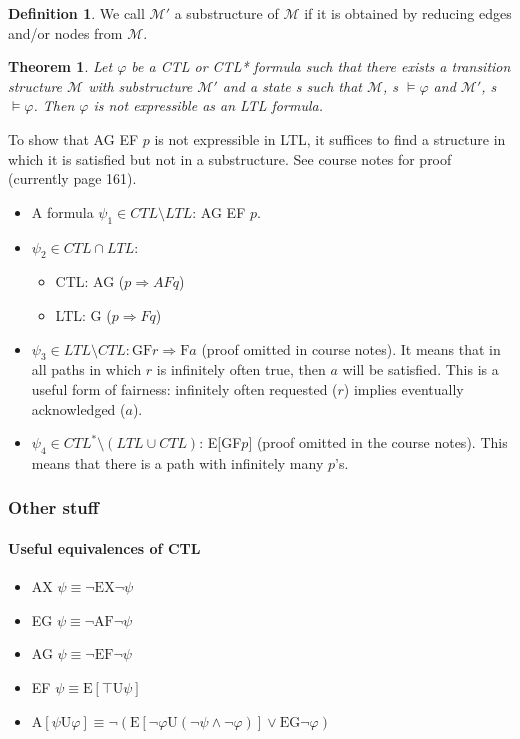 \documentclass[10pt,a4paper]{article}
\theoremstyle{definition}
\newtheorem{definition}{Definition}[section]
\newtheorem{theorem}{Theorem}
\begin{document}
\begin{definition}
We call $\mathcal{M}'$ a substructure of $\mathcal{M}$ if it is obtained by reducing edges and/or nodes from $\mathcal{M}$.
\end{definition}

\begin{theorem}
\textit{Let $\varphi$ be a CTL or CTL* formula such that there exists a transition structure $\mathcal{M}$ with substructure $\mathcal{M}'$ and a state s such that $\mathcal{M}$, s $\models \varphi$ and $\mathcal{M}'$, s $\models \varphi$. Then $\varphi$ is not expressible as an LTL formula.}
\end{theorem}

To show that AG EF $p$ is not expressible in LTL, it suffices to find a structure in which it is satisfied but not in a substructure. See course notes for proof (currently page 161).

\begin{itemize}
	\item A formula $\psi_1 \in CTL \setminus LTL$: AG EF $p$.
	\item $\psi_2 \in CTL \cap LTL:$
	\begin{itemize}
		\item CTL: AG ($p \Rightarrow AF q$)
		\item LTL: G ($p \Rightarrow F q$)
	\end{itemize}
	\item $\psi_3 \in LTL \setminus CTL: \text{GF} r \Rightarrow \text{F} a$ (proof omitted in course notes). It means that in all paths in which $r$ is infinitely often true, then $a$ will be satisfied. This is a useful form of fairness: infinitely often requested ($r$) implies eventually acknowledged ($a$).
	\item $\psi_4 \in CTL^* \setminus (LTL \cup CTL)$: E[GF$p$] (proof omitted in the course notes). This means that there is a path with infinitely many $p$’s.

\end{itemize}

\subsubsection{Other stuff}

\paragraph{Useful equivalences of CTL}
\begin{itemize}
	\item AX $\psi \equiv \lnot \text{EX} \lnot \psi$
	\item EG $\psi \equiv \lnot \text{AF} \lnot \psi$
	\item AG $\psi \equiv \lnot \text{EF} \lnot \psi$
	\item EF $\psi \equiv \text{E}[ \top \text{U} \psi]$
	\item $\text{A}[\psi \text{U} \varphi] \equiv \lnot( \text{E}[ \lnot \varphi \text{U} (\lnot \psi \land \lnot \varphi)] \lor \text{EG} \lnot \varphi)$
\end{itemize}
\end{document}
